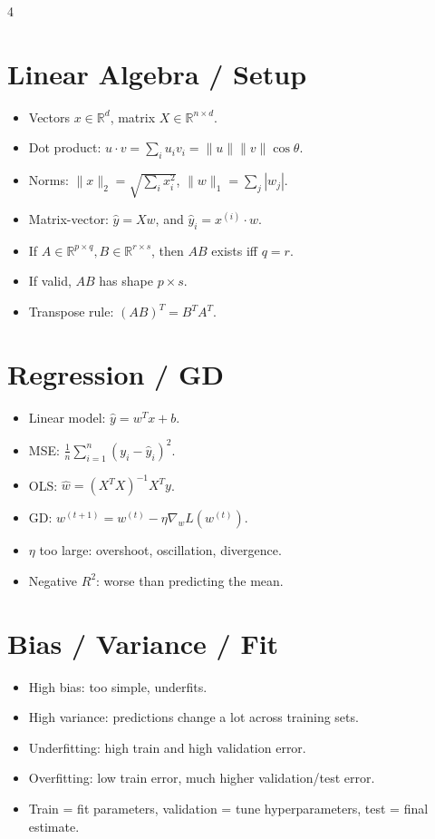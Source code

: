 \documentclass[11pt,landscape]{article}
\newcommand{\R}{\mathbb{R}}
\begin{document}
	\begin{multicols}{4}
		
		\section{Linear Algebra / Setup}
		\begin{itemize}
			\item Vectors $x\in\R^d$, matrix $X\in\R^{n\times d}$.
			\item Dot product: $u\cdot v=\sum_i u_iv_i=\|u\|\|v\|\cos\theta$.
			\item Norms: $\|x\|_2=\sqrt{\sum_i x_i^2}$, $\|w\|_1=\sum_j|w_j|$.
			\item Matrix-vector: $\hat y=Xw$, and $\hat y_i=x^{(i)}\cdot w$.
			\item If $A\in\R^{p\times q}, B\in\R^{r\times s}$, then $AB$ exists iff $q=r$.
			\item If valid, $AB$ has shape $p\times s$.
			\item Transpose rule: $(AB)^T=B^TA^T$.
		\end{itemize}
		
		\section{Regression / GD}
		\begin{itemize}
			\item Linear model: $\hat y=w^Tx+b$.
			\item MSE: $\frac{1}{n}\sum_{i=1}^n (y_i-\hat y_i)^2$.
			\item OLS: $\hat w=(X^TX)^{-1}X^Ty$.
			\item GD: $w^{(t+1)}=w^{(t)}-\eta\nabla_w L(w^{(t)})$.
			\item $\eta$ too large: overshoot, oscillation, divergence.
			\item Negative $R^2$: worse than predicting the mean.
		\end{itemize}
		
		\section{Bias / Variance / Fit}
		\begin{itemize}
			\item High bias: too simple, underfits.
			\item High variance: predictions change a lot across training sets.
			\item Underfitting: high train and high validation error.
			\item Overfitting: low train error, much higher validation/test error.
			\item Train = fit parameters, validation = tune hyperparameters, test = final estimate.
		\end{itemize}
		

\end{multicols}
\end{document}
